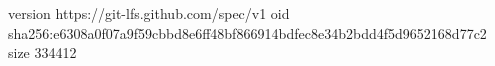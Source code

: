 version https://git-lfs.github.com/spec/v1
oid sha256:e6308a0f07a9f59cbbd8e6ff48bf866914bdfec8e34b2bdd4f5d9652168d77c2
size 334412
